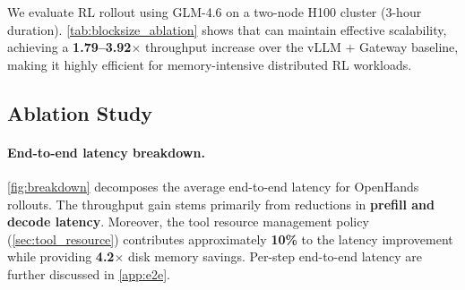We evaluate RL rollout using GLM-4.6 on a two-node H100 cluster (3-hour duration). \autoref{tab:blocksize_ablation} shows that \ouralg can maintain effective scalability, achieving a \textbf{1.79--3.92$\times$} throughput increase over the vLLM $+$ Gateway baseline, making it highly efficient for memory-intensive distributed RL workloads.

\vspace{-2mm}
\subsection{Ablation Study}\label{app:ablation_study}
\paragraph{End-to-end latency breakdown.}
\autoref{fig:breakdown} decomposes the average end-to-end latency for OpenHands rollouts. The throughput gain stems primarily from reductions in \textbf{prefill and decode latency}. Moreover, the tool resource management policy (\autoref{sec:tool_resource}) contributes approximately \textbf{10\%} to the latency improvement while providing \textbf{4.2$\times$} disk memory savings. Per-step end-to-end latency are further discussed in \autoref{app:e2e}.

